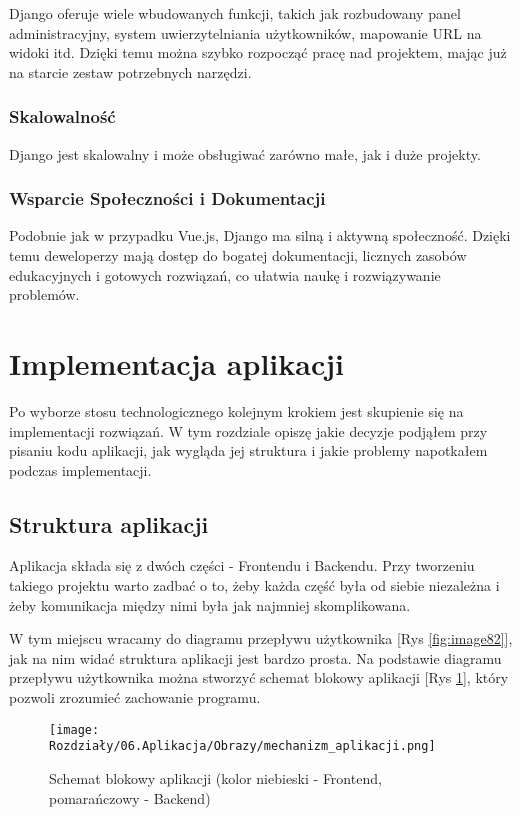 Django oferuje wiele wbudowanych funkcji, takich jak rozbudowany panel administracyjny, system uwierzytelniania użytkowników, mapowanie URL na widoki itd. Dzięki temu można szybko rozpocząć pracę nad projektem, mając już na starcie zestaw potrzebnych narzędzi.


\subsubsection*{Skalowalność}

Django jest skalowalny i może obsługiwać zarówno małe, jak i duże projekty.

\subsubsection*{Wsparcie Społeczności i Dokumentacji}

Podobnie jak w przypadku Vue.js, Django ma silną i aktywną społeczność. Dzięki temu deweloperzy mają dostęp do bogatej dokumentacji, licznych zasobów edukacyjnych i gotowych rozwiązań, co ułatwia naukę i rozwiązywanie problemów.


\section{Implementacja aplikacji}

Po wyborze stosu technologicznego kolejnym krokiem jest skupienie się na implementacji rozwiązań. W tym rozdziale opiszę jakie decyzje podjąłem przy pisaniu kodu aplikacji, jak wygląda jej struktura i jakie problemy napotkałem podczas implementacji.

\subsection*{Struktura aplikacji}

Aplikacja składa się z dwóch części - Frontendu i Backendu. Przy tworzeniu takiego projektu warto zadbać o to, żeby każda część była od siebie niezależna i żeby komunikacja między nimi była jak najmniej skomplikowana.

W tym miejscu wracamy do diagramu przepływu użytkownika [Rys \ref{fig:image82}], jak na nim widać struktura aplikacji jest bardzo prosta. Na podstawie diagramu przepływu użytkownika można stworzyć schemat blokowy aplikacji [Rys \ref{fig:image87}], który pozwoli zrozumieć zachowanie programu.

\begin{figure}[H]
    \centering
    \texttt{[image: Rozdziały/06.Aplikacja/Obrazy/mechanizm\_aplikacji.png]}  
    \caption{Schemat blokowy aplikacji (kolor niebieski - Frontend, pomarańczowy - Backend)}
    \label{fig:image87}
\end{figure}

